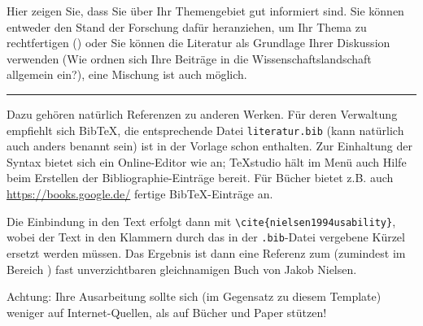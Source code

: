 Hier zeigen Sie, dass Sie über Ihr Themengebiet gut informiert sind. Sie können entweder den Stand der Forschung dafür heranziehen, um Ihr Thema zu rechtfertigen () oder Sie können die Literatur als Grundlage Ihrer Diskussion verwenden (Wie ordnen sich Ihre Beiträge in die Wissenschaftslandschaft allgemein ein?), eine Mischung ist auch möglich.

\hfil\rule{0.4\textwidth}{0.4pt}

Dazu gehören natürlich Referenzen zu anderen Werken. Für deren Verwaltung empfiehlt sich BibTeX, die entsprechende Datei \verb|literatur.bib| (kann natürlich auch anders benannt sein) ist in der Vorlage schon enthalten. Zur Einhaltung der Syntax bietet sich ein Online-Editor wie \cite{BibTexOnlineEditor} an; TeXstudio \cite{texstudio} hält im Menü auch Hilfe beim Erstellen der Bibliographie-Einträge bereit. Für Bücher bietet z.B. auch \url{https://books.google.de/} fertige BibTeX-Einträge an.

Die Einbindung in den Text erfolgt dann mit \verb|\cite{nielsen1994usability}|, wobei der Text in den Klammern durch das in der \verb|.bib|-Datei vergebene Kürzel ersetzt werden müssen. Das Ergebnis ist dann eine Referenz zum (zumindest im Bereich ) fast unverzichtbaren gleichnamigen Buch \cite{nielsen1994usability} von Jakob Nielsen.

Achtung: Ihre Ausarbeitung sollte sich (im Gegensatz zu diesem Template) weniger auf Internet-Quellen, als auf Bücher und Paper stützen!
\\
